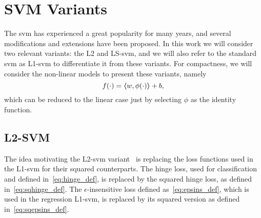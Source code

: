 \section{SVM Variants}\label{sec:svm_variants}
The \acrshort{svm} has experienced a great popularity for many years, and several modifications and extensions have been proposed. In this work we will consider two relevant variants: the L2 and LS-\acrshort{svm}, and we will also refer to the standard \acrshort{svm} as L1-\acrshort{svm} to differentiate it from these variants.
%
For compactness, we will consider the non-linear models to present these variants, namely 
$$ f(\cdot) = \bm{\left\langle} w, \phi(\cdot) \bm{\right\rangle} + b ,$$
which can be reduced to the linear case just by selecting $\phi$ as the identity function.


\subsection{L2-SVM}
The idea motivating the L2-\acrshort{svm} variant~\citep{Burges98} is replacing the loss functions used in the L1-\acrshort{svm} for their squared counterparts. 
The hinge loss, used for classification and defined in~\eqref{eq:hinge_def}, is replaced by the squared hinge loss, as defined in~\eqref{eq:sqhinge_def}.
The $\epsilon$-insensitive loss defined as~\eqref{eq:epsins_def}, which is used in the regression L1-\acrshort{svm}, is replaced by its squared version as defined in~\eqref{eq:sqepsins_def}.
%

